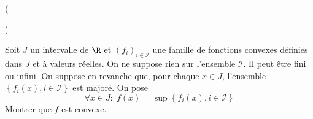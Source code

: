 \begin{tiny}()\end{tiny} Soit $J$ un intervalle de $\R$ et $(f_i)_{i\in \mathcal I}$ une famille de fonctions convexes définies dans $J$ et à valeurs réelles. On ne suppose rien sur l'ensemble $\mathcal I$. Il peut être fini ou infini. On suppose en revanche que, pour chaque $x\in J$, l'ensemble $\left\lbrace f_i(x),i\in \mathcal I \right\rbrace $ est majoré. On pose
\begin{displaymath}
 \forall x\in J :\; f(x) = \sup \left\lbrace f_i(x),i\in \mathcal I \right\rbrace 
\end{displaymath}
Montrer que $f$ est convexe.